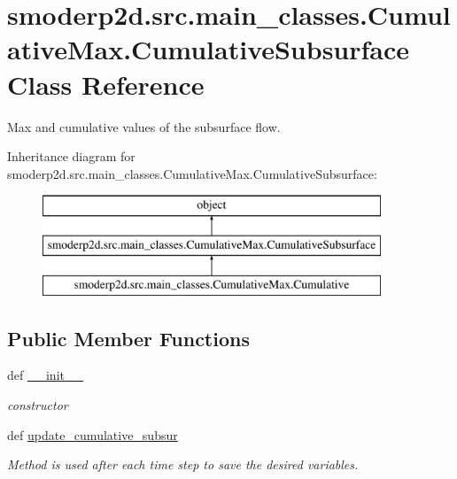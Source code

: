 \hypertarget{classsmoderp2d_1_1src_1_1main__classes_1_1CumulativeMax_1_1CumulativeSubsurface}{\section{smoderp2d.\-src.\-main\-\_\-classes.\-Cumulative\-Max.\-Cumulative\-Subsurface Class Reference}
\label{classsmoderp2d_1_1src_1_1main__classes_1_1CumulativeMax_1_1CumulativeSubsurface}
}


Max and cumulative values of the subsurface flow.  


Inheritance diagram for smoderp2d.\-src.\-main\-\_\-classes.\-Cumulative\-Max.\-Cumulative\-Subsurface\-:\begin{figure}[H]
\begin{center}
\leavevmode
\includegraphics[height=3.000000cm]{classsmoderp2d_1_1src_1_1main__classes_1_1CumulativeMax_1_1CumulativeSubsurface}
\end{center}
\end{figure}
\subsection*{Public Member Functions}
\begin{DoxyCompactItemize}
\item 
\hypertarget{classsmoderp2d_1_1src_1_1main__classes_1_1CumulativeMax_1_1CumulativeSubsurface_a1c6651aa035dc033023bd0e88a7b795c}{def \hyperlink{classsmoderp2d_1_1src_1_1main__classes_1_1CumulativeMax_1_1CumulativeSubsurface_a1c6651aa035dc033023bd0e88a7b795c}{\-\_\-\-\_\-init\-\_\-\-\_\-}}\label{classsmoderp2d_1_1src_1_1main__classes_1_1CumulativeMax_1_1CumulativeSubsurface_a1c6651aa035dc033023bd0e88a7b795c}

\begin{DoxyCompactList}\small\item\em constructor \end{DoxyCompactList}\item 
def \hyperlink{classsmoderp2d_1_1src_1_1main__classes_1_1CumulativeMax_1_1CumulativeSubsurface_a1cd15ec0c1b0a48ea407bededae616f1}{update\-\_\-cumulative\-\_\-subsur}
\begin{DoxyCompactList}\small\item\em Method is used after each time step to save the desired variables. \end{DoxyCompactList}\end{DoxyCompactItemize}
